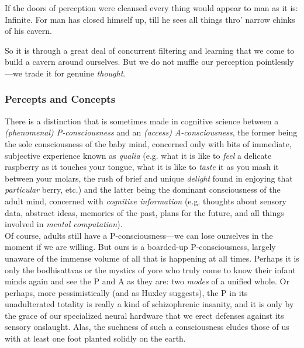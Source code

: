 \begin{displayquote}
	If the doors of perception were cleansed every thing would appear to man as it is: Infinite. For man has closed himself up, till he sees all things thro' narrow chinks of his cavern. \\
\end{displayquote}

So it is through a great deal of concurrent filtering and learning that we come to build a cavern around ourselves. But we do not muffle our perception pointlessly---we trade it for genuine \textit{thought}. \\

\subsubsection{Percepts and Concepts}

There is a distinction that is sometimes made in cognitive science between a \textit{(phenomenal) P-consciousness} and an \textit{(access) A-consciousness}, the former being the sole consciousness of the baby mind, concerned only with bits of immediate, subjective experience known as \textit{qualia} (e.g. what it is like to \textit{feel} a delicate raspberry as it touches your tongue, what it is like to \textit{taste} it as you mash it between your molars, the rush of brief and unique \textit{delight} found in enjoying that \textit{particular} berry, etc.) and the latter being the dominant consciousness of the adult mind, concerned with \textit{cognitive information} (e.g. thoughts about sensory data, abstract ideas, memories of the past, plans for the future, and all things involved in \textit{mental computation}). \\

Of course, adults still have a P-consciousness---we can lose ourselves in the moment if we are willing. But ours is a boarded-up P-consciousness, largely unaware of the immense volume of all that is happening at all times. Perhaps it is only the bodhisattvas or the mystics of yore who truly come to know their infant minds again and see the P and A as they are: two \textit{modes} of a unified whole. Or perhaps, more pessimistically (and as Huxley suggests), the P in its unadulterated totality is really a kind of schizophrenic insanity, and it is only by the grace of our specialized neural hardware that we erect defenses against its sensory onslaught. Alas, the suchness of such a consciousness eludes those of us with at least one foot planted solidly on the earth. \\\\

